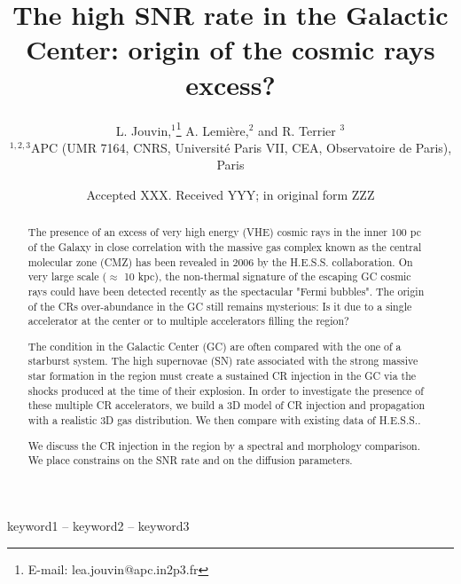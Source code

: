 \documentclass[a4paper,fleqn,usenatbib]{mnras}
\title[]{The high SNR rate in the Galactic Center: origin of the cosmic rays excess?}
\author[L. Jouvin et al.]{
L. Jouvin,$^{1}$\thanks{E-mail: lea.jouvin@apc.in2p3.fr}
A. Lemi\`ere,$^{2}$
and R. Terrier $^{3}$
\\
$^{1,2,3}$APC (UMR 7164, CNRS, Universit\'e Paris VII, CEA, Observatoire de Paris), Paris
}
\date{Accepted XXX. Received YYY; in original form ZZZ}
\begin{document}
\label{firstpage}
\pagerange{\pageref{firstpage}--\pageref{lastpage}}
\maketitle

\begin{abstract}
The presence of an excess of very high energy (VHE) cosmic rays in the inner 100 pc of the Galaxy in close correlation with the massive gas complex known as the central molecular zone (CMZ) has been revealed in 2006 by the H.E.S.S. collaboration. On very large scale ($\approx$ 10 kpc), the non-thermal signature of the escaping GC cosmic rays could have been detected recently as the spectacular "Fermi bubbles". The origin of the CRs over-abundance in the GC still remains mysterious: Is it due to a single accelerator at the center or to multiple accelerators filling the region?

The condition in the Galactic Center (GC) are often compared with the one of a starburst system. The high supernovae (SN) rate associated with the strong massive star formation in the region must create a sustained CR injection in the GC via the shocks produced at the time of their explosion. In order to investigate the presence of these multiple CR accelerators, we build a 3D model of CR injection and propagation with a realistic 3D gas distribution. We then compare with existing data of H.E.S.S..

We discuss the CR injection in the region by a spectral and morphology comparison. We place constrains on the SNR rate and on the diffusion parameters.
\end{abstract}

\begin{keywords}
keyword1 -- keyword2 -- keyword3
\end{keywords}


\end{document}
